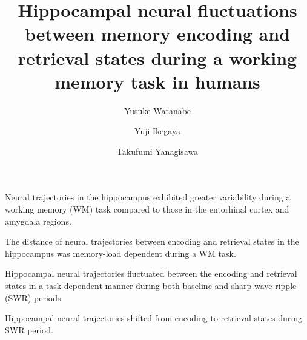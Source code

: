 \documentclass[final,3p,times,twocolumn]{elsarticle}
\begin{document}
\begin{frontmatter}
\begin{highlights}

\item Neural trajectories in the hippocampus exhibited greater variability during a working memory (WM) task compared to those in the entorhinal cortex and amygdala regions.

\item The distance of neural trajectories between encoding and retrieval states in the hippocampus was memory-load dependent during a WM task.


\item Hippocampal neural trajectories fluctuated between the encoding and retrieval states in a task-dependent manner during both baseline and sharp-wave ripple (SWR) periods.

\item Hippocampal neural trajectories shifted from encoding to retrieval states during SWR period.

\end{highlights}\title{
Hippocampal neural fluctuations between memory encoding and retrieval states during a working memory task in humans
}\author[1]{Yusuke Watanabe}
\author[2,3,4]{Yuji Ikegaya}
\author[1,5]{Takufumi Yanagisawa}

\address[1]{Institute for Advanced Cocreation studies, Osaka University, 2-2 Yamadaoka, Suita, 565-0871, Osaka, Japan}
\address[2]{Graduate School of Pharmaceutical Sciences, The University of Tokyo, 7-3-1 Hongo, Tokyo, 113-0033, Japan}
\address[3]{Institute for AI and Beyond, The University of Tokyo, 7-3-1 Hongo, Tokyo, 113-0033, Japan}
\address[4]{Center for Information and Neural Networks, National Institute of Information and Communications Technology, 1-4 Yamadaoka, Suita City, 565-0871, Osaka, Japan}
\address[5]{Department of Neurosurgery, Osaka University Graduate School of Medicine, 2-2 Yamadaoka, Osaka, 565-0871, Japan}



\end{frontmatter}
\end{document}
